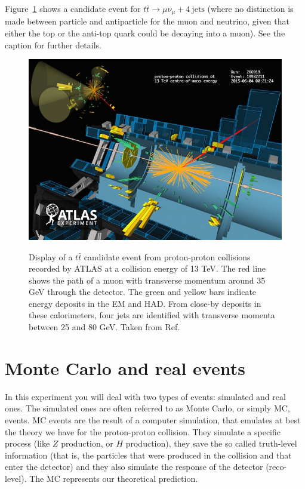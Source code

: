 Figure~\ref{fig:ttbar_eventdisplay} shows a candidate event for $t\bar{t} \rightarrow \mu \nu_{\mu} + 4\ \mathrm{jets}$ (where no distinction is made between particle and antiparticle for the muon and neutrino, given that either the top  or the anti-top quark could be decaying into a muon). See the caption for further details. 

\begin{figure}[tb] 
	\centering
	\includegraphics[width=0.7\columnwidth]{Figures/ATLAS_ttbar_candidate_13TeV_VP1_run266919_evt19982211_thumb.jpg}
	\label{fig:ttbar_eventdisplay}
	\caption{Display of a $t\bar{t}$ candidate event from proton-proton collisions recorded by ATLAS at a collision energy of 13 TeV. The red line shows the path of a muon with transverse momentum around 35 GeV through the detector. The green and yellow bars indicate energy deposits in the EM and HAD. From close-by deposits in these calorimeters, four jets are identified with transverse momenta between 25 and 80 GeV. Taken from Ref.~\cite{ATLAS_ttbar_evtdisplay}}
\end{figure}

\section{Monte Carlo and real events}

In this experiment you will deal with two types of events: simulated and real ones. The simulated ones are often referred to as Monte Carlo, or simply MC, events. MC events are the result of a computer simulation, that emulates at best the theory we have for the proton-proton collision. They simulate a specific process (like $Z$ production, or $H$ production), they save the so called truth-level information (that is, the particles that were produced in the collision and that enter the detector) and they also simulate the response of the detector (reco-level). The MC represents our theoretical prediction. 


